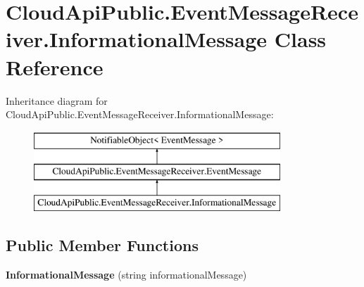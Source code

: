 \hypertarget{class_cloud_api_public_1_1_event_message_receiver_1_1_informational_message}{\section{Cloud\-Api\-Public.\-Event\-Message\-Receiver.\-Informational\-Message Class Reference}
\label{class_cloud_api_public_1_1_event_message_receiver_1_1_informational_message}
}
Inheritance diagram for Cloud\-Api\-Public.\-Event\-Message\-Receiver.\-Informational\-Message\-:\begin{figure}[H]
\begin{center}
\leavevmode
\includegraphics[height=3.000000cm]{class_cloud_api_public_1_1_event_message_receiver_1_1_informational_message}
\end{center}
\end{figure}
\subsection*{Public Member Functions}
\begin{DoxyCompactItemize}
\item 
\hypertarget{class_cloud_api_public_1_1_event_message_receiver_1_1_informational_message_aae778e61a389efd72928fd790c2225a4}{{\bfseries Informational\-Message} (string informational\-Message)}\label{class_cloud_api_public_1_1_event_message_receiver_1_1_informational_message_aae778e61a389efd72928fd790c2225a4}

\end{DoxyCompactItemize}
